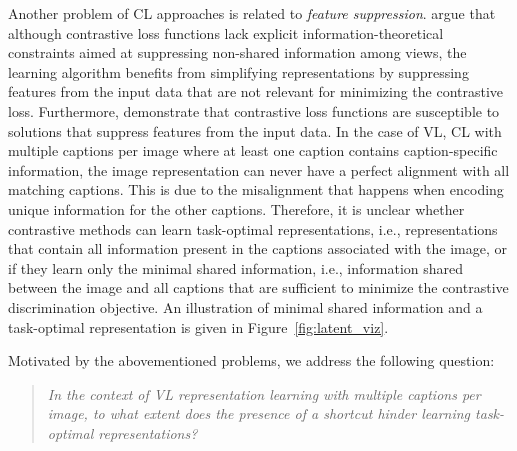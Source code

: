 Another problem of \ac{CL} approaches is related to \emph{feature suppression}. 
\cite{shwartz2023compress} argue that although contrastive loss functions lack explicit information-theoretical constraints aimed at suppressing non-shared information among views, the learning algorithm benefits from simplifying representations by suppressing features from the input data that are not relevant for minimizing the contrastive loss.
Furthermore, \citet{robinson2021can} demonstrate that contrastive loss functions are susceptible to solutions that suppress features from the input data.
In the case of \ac{VL}, \ac{CL} with multiple captions per image where at least one caption contains caption-specific information, the image representation can never have a perfect alignment with all matching captions.
This is due to the misalignment that happens when encoding unique information for the other captions.
Therefore, it is unclear whether contrastive methods can learn task-optimal representations, i.e., representations that contain all information present in the captions associated with the image, or if they learn only the minimal shared information, i.e., information shared between the image and all captions that are sufficient to minimize the contrastive discrimination objective. 
An illustration of minimal shared information and a task-optimal representation is given in Figure~\ref{fig:latent_viz}. 

 

Motivated by the abovementioned problems, we address the following question:
\begin{quote}
\emph{In the context of \ac{VL} representation learning with multiple captions per image, to what extent does the presence of a shortcut hinder learning task-optimal representations?}
\end{quote}

